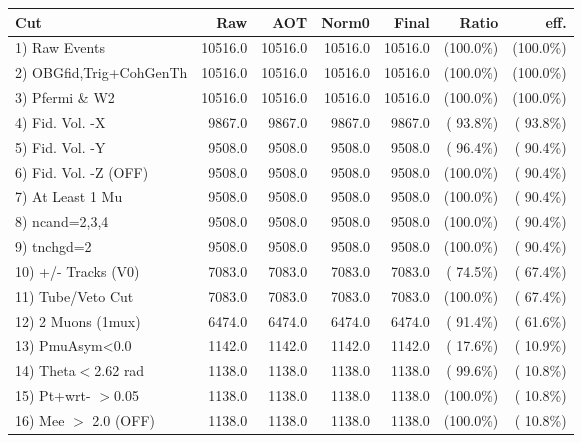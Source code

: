  \begin{table}[h!]\centering
 \begin{tabular}{||l||r|r|r|r|r|r||}
 \hline
 \hline
 Cut & Raw & AOT & Norm0 & Final & Ratio & eff.       \\
 \hline
  1) Raw Events           &      10516.0 &      10516.0 &      10516.0 &      10516.0 & (100.0\%) & (100.0\%) \\
  2) OBGfid,Trig+CohGenTh &      10516.0 &      10516.0 &      10516.0 &      10516.0 & (100.0\%) & (100.0\%) \\
  3) Pfermi \& W2         &      10516.0 &      10516.0 &      10516.0 &      10516.0 & (100.0\%) & (100.0\%) \\
  4) Fid. Vol. -X         &       9867.0 &       9867.0 &       9867.0 &       9867.0 & ( 93.8\%) & ( 93.8\%) \\
  5) Fid. Vol. -Y         &       9508.0 &       9508.0 &       9508.0 &       9508.0 & ( 96.4\%) & ( 90.4\%) \\
  6) Fid. Vol. -Z (OFF)   &       9508.0 &       9508.0 &       9508.0 &       9508.0 & (100.0\%) & ( 90.4\%) \\
  7) At Least 1 Mu        &       9508.0 &       9508.0 &       9508.0 &       9508.0 & (100.0\%) & ( 90.4\%) \\
  8) ncand=2,3,4          &       9508.0 &       9508.0 &       9508.0 &       9508.0 & (100.0\%) & ( 90.4\%) \\
  9) tnchgd=2             &       9508.0 &       9508.0 &       9508.0 &       9508.0 & (100.0\%) & ( 90.4\%) \\
 10) +/- Tracks (V0)      &       7083.0 &       7083.0 &       7083.0 &       7083.0 & ( 74.5\%) & ( 67.4\%) \\
 11) Tube/Veto Cut        &       7083.0 &       7083.0 &       7083.0 &       7083.0 & (100.0\%) & ( 67.4\%) \\
 12) 2 Muons (1mux)       &       6474.0 &       6474.0 &       6474.0 &       6474.0 & ( 91.4\%) & ( 61.6\%) \\
 13) PmuAsym<0.0          &       1142.0 &       1142.0 &       1142.0 &       1142.0 & ( 17.6\%) & ( 10.9\%) \\
 14) Theta$<$2.62 rad     &       1138.0 &       1138.0 &       1138.0 &       1138.0 & ( 99.6\%) & ( 10.8\%) \\
 15) Pt+wrt- $>$0.05      &       1138.0 &       1138.0 &       1138.0 &       1138.0 & (100.0\%) & ( 10.8\%) \\
 16) Mee $>$ 2.0  (OFF)   &       1138.0 &       1138.0 &       1138.0 &       1138.0 & (100.0\%) & ( 10.8\%) \\

\end{tabular}
\end{table}
